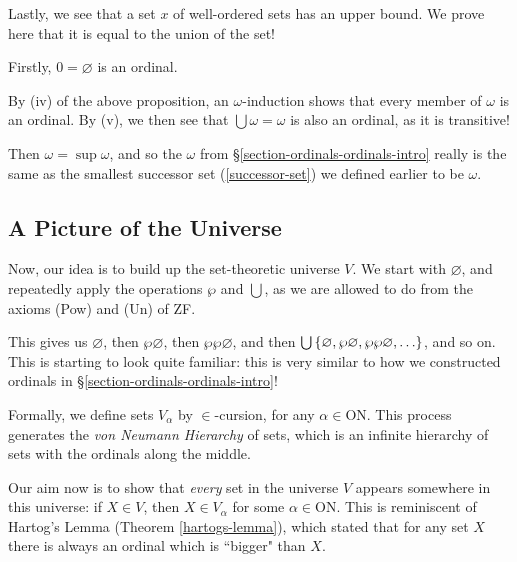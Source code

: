 \documentclass{article}
\begin{document}
\begin{note}
	Lastly, we see that a set $x$ of well-ordered sets has an upper bound. We prove here that it is equal to the union of the set!
\end{note}

\begin{example}
    Firstly, $0 = \varnothing$ is an ordinal.
    
    By (iv) of the above proposition, an $\omega$-induction shows that every member of $\omega$ is an ordinal. By (v), we then see that $\bigcup \omega = \omega$ is also an ordinal, as it is transitive!
    
    Then $\omega = \sup \omega$, and so the $\omega$ from \S\ref{section-ordinals-ordinals-intro} really is the same as the smallest successor set (\ref{successor-set}) we defined earlier to be $\omega$.
\end{example}


\subsection{A Picture of the Universe}

Now, our idea is to build up the set-theoretic universe $V$. We start with $\varnothing$, and repeatedly apply the operations $\wp$ and $\bigcup$, as we are allowed to do from the axioms (Pow) and (Un) of ZF.

This gives us $\varnothing$, then $\wp\varnothing$, then $\wp\wp\varnothing$, and then $\bigcup\set{\varnothing, \wp\varnothing, \wp\wp\varnothing, \dots}$, and so on. This is starting to look quite familiar: this is very similar to how we constructed ordinals in \S\ref{section-ordinals-ordinals-intro}!

Formally, we define sets $V_\alpha$ by $\in$-cursion, for any $\alpha \in \mathrm{ON}$. This process generates the \textit{von Neumann Hierarchy} of sets, which is an infinite hierarchy of sets with the ordinals along the middle.


Our aim now is to show that \textit{every} set in the universe $V$ appears somewhere in this universe: if $X \in V$, then $X \in V_\alpha$ for some $\alpha \in \mathrm{ON}$. This is reminiscent of Hartog's Lemma (Theorem \ref{hartogs-lemma}), which stated that for any set $X$ there is always an ordinal which is ``bigger" than $X$.
\end{document}
